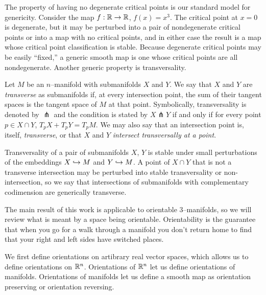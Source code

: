 The property of having no degenerate critical points is our standard model for genericity.
Consider the map $f:\mathbb{R}\to\mathbb{R}$, $f(x)=x^3$.
The critical point at $x=0$ is degenerate, but it may be perturbed into a pair of nondegenerate critical points or into a map with no critical points, and in either case the result is a map whose critical point classification is stable.
Because degenerate critical points may be easily ``fixed,'' a generic smooth map is one whose critical points are all nondegenerate.
Another generic property is transversality.

\begin{defn}
	Let $M$ be an $n$--manifold with submanifolds $X$ and $Y$.
	We say that $X$ and $Y$ are \emph{transverse} as submanifolds if, at every intersection point, the sum of their tangent spaces is the tangent space of $M$ at that point.
	Symbolically, transversality is denoted by $\pitchfork$ and the condition is stated by $X\pitchfork Y$ if and only if for every point $p\in X\cap Y$, $T_p X+ T_p Y=T_p M$.
	We may also say that an intersection point is, itself, \emph{transverse}, or that $X$ and $Y$ \emph{intersect transversally at a point}.	
\end{defn}

Transversality of a pair of submanifolds $X$, $Y$ is stable under small perturbations of the embeddings $X\hookrightarrow M$ and $Y\hookrightarrow M$.
A point of $X\cap Y$ that is not a transverse intersection may be perturbed into stable transversality or non-intersection, so we say that intersections of submanifolds with complementary codimension are generically transverse.

The main result of this work is applicable to orientable 3--manifolds, so we will review what is meant by a space being orientable.
Orientability is the guarantee that when you go for a walk through a manifold you don't return home to find that your right and left sides have switched places.

We first define orientations on artibrary real vector spaces, which allows us to define orientations on $\mathbb{R}^n$.
Orientations of $\mathbb{R}^n$ let us define orientations of manifolds.
Orientations of manifolds let us define a smooth map as orientation preserving or orientation reversing.


